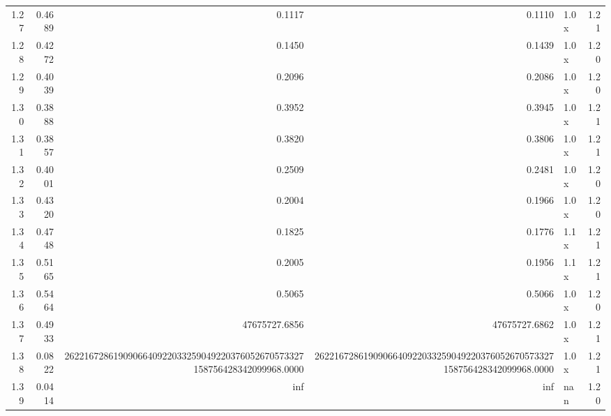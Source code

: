 \begin{tabular}{rrrrlr}
1.27 & 0.4689 & 0.1117 & 0.1110 & 1.0x & 1.21 \\
1.28 & 0.4272 & 0.1450 & 0.1439 & 1.0x & 1.20 \\
1.29 & 0.4039 & 0.2096 & 0.2086 & 1.0x & 1.20 \\
1.30 & 0.3888 & 0.3952 & 0.3945 & 1.0x & 1.21 \\
1.31 & 0.3857 & 0.3820 & 0.3806 & 1.0x & 1.21 \\
1.32 & 0.4001 & 0.2509 & 0.2481 & 1.0x & 1.20 \\
1.33 & 0.4320 & 0.2004 & 0.1966 & 1.0x & 1.20 \\
1.34 & 0.4748 & 0.1825 & 0.1776 & 1.1x & 1.21 \\
1.35 & 0.5165 & 0.2005 & 0.1956 & 1.1x & 1.21 \\
1.36 & 0.5464 & 0.5065 & 0.5066 & 1.0x & 1.20 \\
1.37 & 0.4933 & 47675727.6856 & 47675727.6862 & 1.0x & 1.21 \\
1.38 & 0.0822 & 2622167286190906640922033259049220376052670573327158756428342099968.0000 & 2622167286190906640922033259049220376052670573327158756428342099968.0000 & 1.0x & 1.21 \\
1.39 & 0.0414 & inf & inf & nan & 1.20 \\
\bottomrule
\end{tabular}

